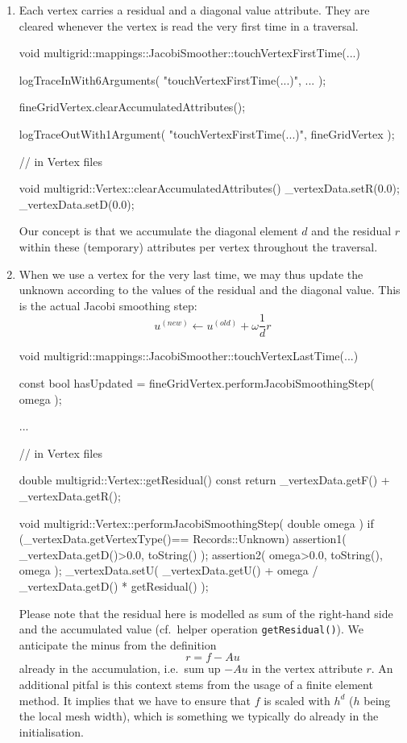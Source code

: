 \begin{enumerate}
  \item Each vertex carries a residual and a diagonal value attribute. 
    They are cleared whenever the vertex is read the very first time in
    a traversal.
    \begin{code}
void multigrid::mappings::JacobiSmoother::touchVertexFirstTime(...) {
  logTraceInWith6Arguments( "touchVertexFirstTime(...)", ... );

  fineGridVertex.clearAccumulatedAttributes();

  logTraceOutWith1Argument( "touchVertexFirstTime(...)", fineGridVertex );
}

// in Vertex files

void multigrid::Vertex::clearAccumulatedAttributes() {
  _vertexData.setR(0.0);
  _vertexData.setD(0.0);
}
    \end{code}
    
    \noindent
    Our concept is that we accumulate the diagonal element $d$ and the residual
    $r$ within these (temporary) attributes per vertex throughout the traversal.
    
    \item When we use a vertex for the very last time, we may thus update the
    unknown according to the values of the residual and the diagonal value. This
    is the actual Jacobi smoothing step:
    \[
      u ^{(new)} \gets u ^{(old)} + \omega \frac{1}{d} r
    \]
    \begin{code}
void multigrid::mappings::JacobiSmoother::touchVertexLastTime(...) {
  const bool hasUpdated = fineGridVertex.performJacobiSmoothingStep( omega );
  
  ...
}

// in Vertex files

double multigrid::Vertex::getResidual() const {
  return _vertexData.getF() + _vertexData.getR();
}


void multigrid::Vertex::performJacobiSmoothingStep( double omega ) {
  if (_vertexData.getVertexType()== Records::Unknown) {
    assertion1( _vertexData.getD()>0.0, toString() );
    assertion2( omega>0.0, toString(), omega );
    _vertexData.setU( _vertexData.getU() + omega / _vertexData.getD() * getResidual() );
  }
}
    \end{code} 
    
    \noindent
    Please note that the residual here is modelled as sum of the right-hand
    side and the accumulated value (cf.~helper operation
    \texttt{getResidual()}).
    We anticipate the minus from the definition 
    \[ r = f - Au \]
    already in the accumulation, i.e.~sum up $-Au$ in the vertex attribute $r$.
    An additional pitfal is this context stems from the usage of a finite
    element method.
    It implies that we have to ensure that $f$ is scaled with $h^d$ ($h$ being the local mesh width), which is something we typically
    do already in the initialisation. 
    

\end{enumerate}
